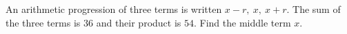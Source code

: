 An arithmetic progression of three terms is written $x-r,\ x,\ x+r$. The sum of the three terms is $36$ and their product is $54$. Find the middle term $x$.
